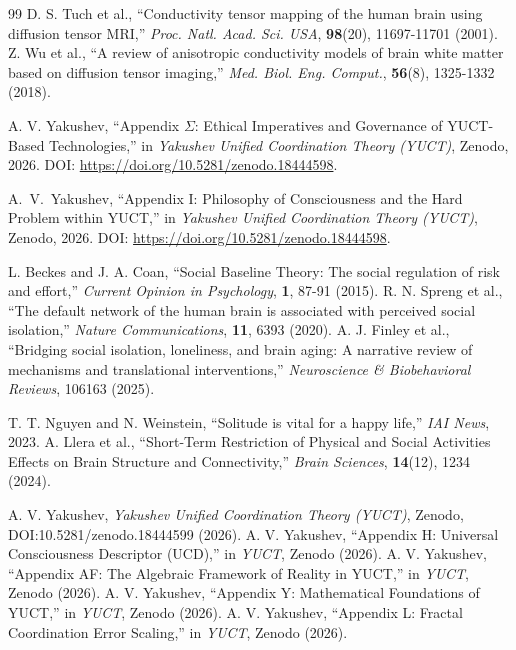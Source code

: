 \documentclass[12pt,a4paper]{article}
\begin{document}
\begin{thebibliography}{99}
		 D. S. Tuch et al., ``Conductivity tensor mapping of the human brain using diffusion tensor MRI,'' \emph{Proc. Natl. Acad. Sci. USA}, \textbf{98}(20), 11697-11701 (2001).
		 Z. Wu et al., ``A review of anisotropic conductivity models of brain white matter based on diffusion tensor imaging,'' \emph{Med. Biol. Eng. Comput.}, \textbf{56}(8), 1325-1332 (2018).
		
		 A. V. Yakushev, ``Appendix \(\Sigma\): Ethical Imperatives and Governance of YUCT-Based Technologies,'' in \emph{Yakushev Unified Coordination Theory (YUCT)}, Zenodo, 2026. DOI: \url{https://doi.org/10.5281/zenodo.18444598}.
		
		 A.~V.~Yakushev, ``Appendix I: Philosophy of Consciousness and the Hard Problem within YUCT,'' in \emph{Yakushev Unified Coordination Theory (YUCT)}, Zenodo, 2026. DOI: \url{https://doi.org/10.5281/zenodo.18444598}.
		
		 L. Beckes and J. A. Coan, ``Social Baseline Theory: The social regulation of risk and effort,'' \emph{Current Opinion in Psychology}, \textbf{1}, 87-91 (2015).
		 R. N. Spreng et al., ``The default network of the human brain is associated with perceived social isolation,'' \emph{Nature Communications}, \textbf{11}, 6393 (2020).
		 A. J. Finley et al., ``Bridging social isolation, loneliness, and brain aging: A narrative review of mechanisms and translational interventions,'' \emph{Neuroscience \& Biobehavioral Reviews}, 106163 (2025).
		
		 T. T. Nguyen and N. Weinstein, ``Solitude is vital for a happy life,'' \emph{IAI News}, 2023.
		 A. Llera et al., ``Short-Term Restriction of Physical and Social Activities Effects on Brain Structure and Connectivity,'' \emph{Brain Sciences}, \textbf{14}(12), 1234 (2024).
		
					
			 A. V. Yakushev, \emph{Yakushev Unified Coordination Theory (YUCT)}, Zenodo, DOI:10.5281/zenodo.18444599 (2026).
			 A. V. Yakushev, ``Appendix H: Universal Consciousness Descriptor (UCD),'' in \emph{YUCT}, Zenodo (2026).
			 A. V. Yakushev, ``Appendix AF: The Algebraic Framework of Reality in YUCT,'' in \emph{YUCT}, Zenodo (2026).
			 A. V. Yakushev, ``Appendix Y: Mathematical Foundations of YUCT,'' in \emph{YUCT}, Zenodo (2026).
			 A. V. Yakushev, ``Appendix L: Fractal Coordination Error Scaling,'' in \emph{YUCT}, Zenodo (2026).
			

\end{thebibliography}
\end{document}
